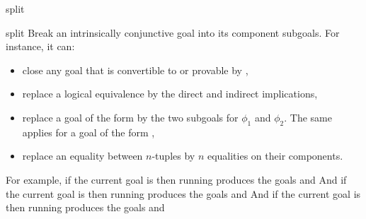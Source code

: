 \begin{tactic}{split}
  \begin{tsyntax}[empty]{split}
  Break an intrinsically conjunctive goal into its component subgoals.
  For instance, it can:
  \begin{itemize}
  \item close any goal that is convertible to  or provable by
    ,
    \item replace a logical equivalence by the direct and indirect implications,
    \item replace a goal of the form  by the two
      subgoals for $\phi_1$ and $\phi_2$. The same applies for a goal of
      the form ,
    \item replace an equality between $n$-tuples by $n$ equalities
          on their components.
  \end{itemize}

  For example, if the current goal is
   then
  running 
  produces the goals
  and
  And if the current goal is
   then
  running 
  produces the goals
  and
  And if the current goal is
   then
  running 
  produces the goals
  and
  \end{tsyntax}
\end{tactic}
